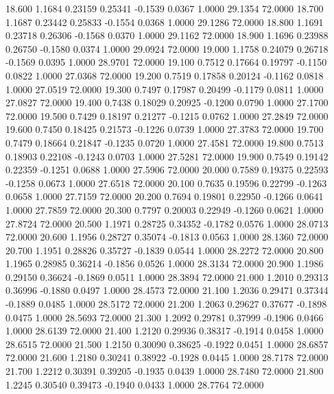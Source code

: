   18.600   1.1684   0.23159   0.25341  -0.1539   0.0367   1.0000  29.1354  72.0000
  18.700   1.1687   0.23442   0.25833  -0.1554   0.0368   1.0000  29.1286  72.0000
  18.800   1.1691   0.23718   0.26306  -0.1568   0.0370   1.0000  29.1162  72.0000
  18.900   1.1696   0.23988   0.26750  -0.1580   0.0374   1.0000  29.0924  72.0000
  19.000   1.1758   0.24079   0.26718  -0.1569   0.0395   1.0000  28.9701  72.0000
  19.100   0.7512   0.17664   0.19797  -0.1150   0.0822   1.0000  27.0368  72.0000
  19.200   0.7519   0.17858   0.20124  -0.1162   0.0818   1.0000  27.0519  72.0000
  19.300   0.7497   0.17987   0.20499  -0.1179   0.0811   1.0000  27.0827  72.0000
  19.400   0.7438   0.18029   0.20925  -0.1200   0.0790   1.0000  27.1700  72.0000
  19.500   0.7429   0.18197   0.21277  -0.1215   0.0762   1.0000  27.2849  72.0000
  19.600   0.7450   0.18425   0.21573  -0.1226   0.0739   1.0000  27.3783  72.0000
  19.700   0.7479   0.18664   0.21847  -0.1235   0.0720   1.0000  27.4581  72.0000
  19.800   0.7513   0.18903   0.22108  -0.1243   0.0703   1.0000  27.5281  72.0000
  19.900   0.7549   0.19142   0.22359  -0.1251   0.0688   1.0000  27.5906  72.0000
  20.000   0.7589   0.19375   0.22593  -0.1258   0.0673   1.0000  27.6518  72.0000
  20.100   0.7635   0.19596   0.22799  -0.1263   0.0658   1.0000  27.7159  72.0000
  20.200   0.7694   0.19801   0.22950  -0.1266   0.0641   1.0000  27.7859  72.0000
  20.300   0.7797   0.20003   0.22949  -0.1260   0.0621   1.0000  27.8724  72.0000
  20.500   1.1971   0.28725   0.34352  -0.1782   0.0576   1.0000  28.0713  72.0000
  20.600   1.1956   0.28727   0.35074  -0.1813   0.0563   1.0000  28.1360  72.0000
  20.700   1.1951   0.28826   0.35727  -0.1839   0.0544   1.0000  28.2272  72.0000
  20.800   1.1965   0.28985   0.36214  -0.1856   0.0526   1.0000  28.3134  72.0000
  20.900   1.1986   0.29150   0.36624  -0.1869   0.0511   1.0000  28.3894  72.0000
  21.000   1.2010   0.29313   0.36996  -0.1880   0.0497   1.0000  28.4573  72.0000
  21.100   1.2036   0.29471   0.37344  -0.1889   0.0485   1.0000  28.5172  72.0000
  21.200   1.2063   0.29627   0.37677  -0.1898   0.0475   1.0000  28.5693  72.0000
  21.300   1.2092   0.29781   0.37999  -0.1906   0.0466   1.0000  28.6139  72.0000
  21.400   1.2120   0.29936   0.38317  -0.1914   0.0458   1.0000  28.6515  72.0000
  21.500   1.2150   0.30090   0.38625  -0.1922   0.0451   1.0000  28.6857  72.0000
  21.600   1.2180   0.30241   0.38922  -0.1928   0.0445   1.0000  28.7178  72.0000
  21.700   1.2212   0.30391   0.39205  -0.1935   0.0439   1.0000  28.7480  72.0000
  21.800   1.2245   0.30540   0.39473  -0.1940   0.0433   1.0000  28.7764  72.0000
